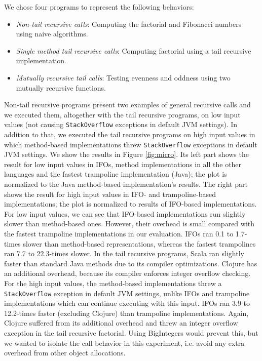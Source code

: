 We chose four programs to represent the following behaviors:
\begin{itemize}

  \item \emph{Non-tail recursive calls}: Computing the factorial and
    Fibonacci numbers using naive algorithms.

  \item \emph{Single method tail recursive calls}: Computing factorial
    using a tail recursive implementation.

  \item \emph{Mutually recursive tail calls}: Testing evenness and
    oddness using two mutually recursive functions.
\end{itemize}
\noindent Non-tail recursive programs present two examples of general
recursive calls and we executed them, altogether with the tail
recursive programs, on low input values (not causing
\lstinline{StackOverflow} exceptions in default JVM settings). In
addition to that, we executed the tail recursive programs on high input
values in which method-based implementations threw
\lstinline{StackOverflow} exceptions in default JVM settings. We show the results in Figure \ref{fig:micro}. Its left part shows
the result for low input values in IFOs, method implementations in all
the other languages and the fastest trampoline implementation (Java);
the plot is normalized to the Java method-based
implementation's results. The right part shows the result for high input values
in IFO- and trampoline-based implementations; the plot is normalized to results of 
IFO-based implementations. For low input values, we can see that IFO-based implementations run
slightly slower than method-based ones. However, their overhead is
small compared with the fastest trampoline implementations in our
evaluation. IFOs ran 0.1 to 1.7-times slower than method-based
representations, whereas the fastest trampolines ran 7.7 to 22.3-times
slower. In the tail recursive programs, Scala ran slightly faster than
standard Java methods due to its compiler optimizations. Clojure has
an additional overhead, because its compiler enforces integer overflow
checking. For the high input values, the method-based implementations threw a
\lstinline{StackOverflow} exception in default JVM settings, unlike
IFOs and trampoline implementations which can continue executing with
this input. IFOs ran 3.9 to 12.2-times faster (excluding Clojure) than
trampoline implementations. Again, Clojure suffered from its
additional overhead and threw an integer overflow exception in the
tail recursive factorial. Using BigIntegers would prevent this, but
we wanted to isolate the call behavior in this experiment, i.e. avoid
any extra overhead from other object allocations.
